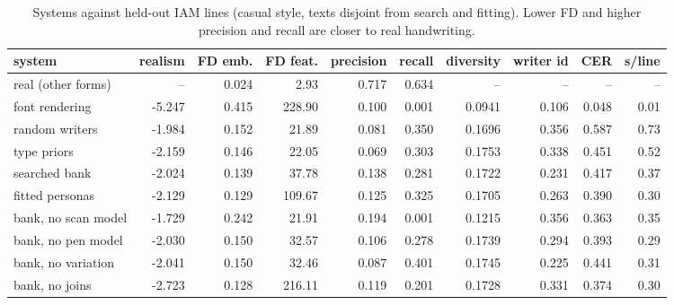 \begin{table}[t]\centering\small
\begin{tabular}{lrrrrrrrrr}\toprule
system & realism & FD emb. & FD feat. & precision & recall & diversity & writer id & CER & s/line\\\midrule
real (other forms) & -- & 0.024 & 2.93 & 0.717 & 0.634 & -- & -- & -- & --\\
font rendering & -5.247 & 0.415 & 228.90 & 0.100 & 0.001 & 0.0941 & 0.106 & 0.048 & 0.01\\
random writers & -1.984 & 0.152 & 21.89 & 0.081 & 0.350 & 0.1696 & 0.356 & 0.587 & 0.73\\
type priors & -2.159 & 0.146 & 22.05 & 0.069 & 0.303 & 0.1753 & 0.338 & 0.451 & 0.52\\
searched bank & -2.024 & 0.139 & 37.78 & 0.138 & 0.281 & 0.1722 & 0.231 & 0.417 & 0.37\\
fitted personas & -2.129 & 0.129 & 109.67 & 0.125 & 0.325 & 0.1705 & 0.263 & 0.390 & 0.30\\
bank, no scan model & -1.729 & 0.242 & 21.91 & 0.194 & 0.001 & 0.1215 & 0.356 & 0.363 & 0.35\\
bank, no pen model & -2.030 & 0.150 & 32.57 & 0.106 & 0.278 & 0.1739 & 0.294 & 0.393 & 0.29\\
bank, no variation & -2.041 & 0.150 & 32.46 & 0.087 & 0.401 & 0.1745 & 0.225 & 0.441 & 0.31\\
bank, no joins & -2.723 & 0.128 & 216.11 & 0.119 & 0.201 & 0.1728 & 0.331 & 0.374 & 0.30\\
\bottomrule\end{tabular}
\caption{Systems against held-out IAM lines (casual style, texts disjoint from search and fitting). Lower FD and higher precision and recall are closer to real handwriting.}
\label{tab:systems}\end{table}

